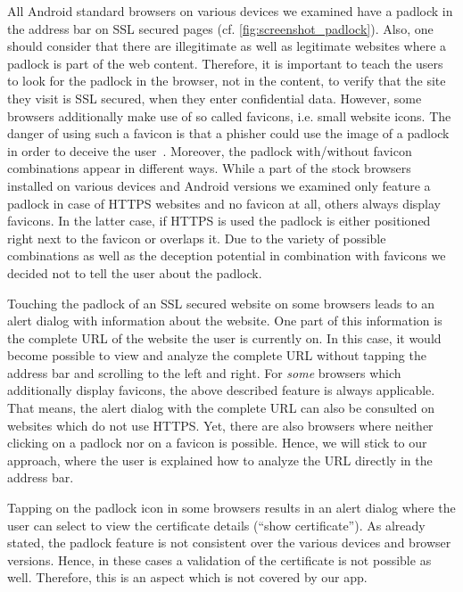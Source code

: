 \begin{description}[leftmargin=0cm]
		\item[HTTPS Padlock] All Android standard browsers on various devices we examined have a padlock in the address bar on SSL secured pages (cf. \autoref{fig:screenshot_padlock}).
Also, one should consider that there are illegitimate as well as legitimate websites where a padlock is part of the web content. 
Therefore, it is important to teach the users to look for the padlock in the browser, not in the content, to verify that the site they visit is SSL secured, when they enter confidential data.
However, some browsers additionally make use of so called favicons, i.e. small website icons.
The danger of using such a favicon is that a phisher could use the image of a padlock in order to deceive the user~\cite{trusteer2011}.
Moreover, the padlock with/without favicon combinations appear in different ways. 
While a part of the stock browsers installed on various devices and Android versions we examined only feature a padlock in case of HTTPS websites and no favicon at all, others always display favicons. 
In the latter case, if HTTPS is used the padlock is either positioned right next to the favicon or overlaps it.
Due to the variety of possible combinations as well as the deception potential in combination with favicons we decided not to tell the user about the padlock.
		\item[Touch Padlock] Touching the padlock of an SSL secured website on some browsers leads to an alert dialog with information about the website. 
One part of this information is the complete URL of the website the user is currently on.
In this case, it would become possible to view and analyze the complete URL without tapping the address bar and scrolling to the left and right.
For \textit{some} browsers which additionally display favicons, the above described feature is always applicable.
That means, the alert dialog with the complete URL can also be consulted on websites which do not use HTTPS.
Yet, there are also browsers where neither clicking on a padlock nor on a favicon is possible.
Hence, we will stick to our approach, where the user is explained how to analyze the URL directly in the address bar.
		\item[Certificate Verification]Tapping on the padlock icon in some browsers results in an alert dialog where the user can select to view the certificate details (``show certificate'').
As already stated, the padlock feature is not consistent over the various devices and browser versions.
Hence, in these cases a validation of the certificate is not possible as well.
Therefore, this is an aspect which is not covered by our app.

\end{description}

